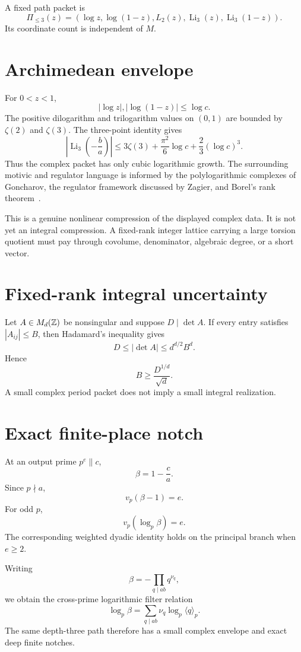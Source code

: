 A fixed path packet is
\[
 \Pi_{\le3}(z)
 =
 \left(
 \log z,
 \log(1-z),
 L_2(z),
 \operatorname{Li}_3(z),
 \operatorname{Li}_3(1-z)
 \right).
\]
Its coordinate count is independent of $M$.

\section{Archimedean envelope}
For $0<z<1$,
\[
 |\log z|,
 |\log(1-z)|
 \le\log c.
\]
The positive dilogarithm and trilogarithm values on $(0,1)$ are bounded by $\zeta(2)$ and $\zeta(3)$. The three-point identity gives
\[
 \left|\operatorname{Li}_3\left(-\frac ba\right)\right|
 \le
 3\zeta(3)
 +
 \frac{\pi^2}{6}\log c
 +
 \frac23(\log c)^3.
\]
Thus the complex packet has only cubic logarithmic growth. The surrounding motivic and regulator language is informed by the polylogarithmic complexes of Goncharov, the regulator framework discussed by Zagier, and Borel's rank theorem~\cite{Goncharov,ZagierPolylog,Borel}.

This is a genuine nonlinear compression of the displayed complex data. It is not yet an integral compression. A fixed-rank integer lattice carrying a large torsion quotient must pay through covolume, denominator, algebraic degree, or a short vector.

\section{Fixed-rank integral uncertainty}
Let $A\in M_d(\mathbb Z)$ be nonsingular and suppose $D\mid\det A$. If every entry satisfies $|A_{ij}|\le B$, then Hadamard's inequality gives
\[
 D\le|\det A|\le d^{d/2}B^d.
\]
Hence
\[
 \boxed{
 B\ge\frac{D^{1/d}}{\sqrt d}.
 }
\]
A small complex period packet does not imply a small integral realization.

\section{Exact finite-place notch}
At an output prime $p^e\parallel c$,
\[
 \beta=1-\frac ca.
\]
Since $p\nmid a$,
\[
 v_p(\beta-1)=e.
\]
For odd $p$,
\[
 \boxed{
 v_p(\log_p\beta)=e.
 }
\]
The corresponding weighted dyadic identity holds on the principal branch when $e\ge2$.

Writing
\[
 \beta=-\prod_{q\mid ab}q^{\nu_q},
\]
we obtain the cross-prime logarithmic filter relation
\[
 \boxed{
 \log_p\beta
 =
 \sum_{q\mid ab}
 \nu_q\log_p\langle q\rangle_p.
 }
\]
The same depth-three path therefore has a small complex envelope and exact deep finite notches.

